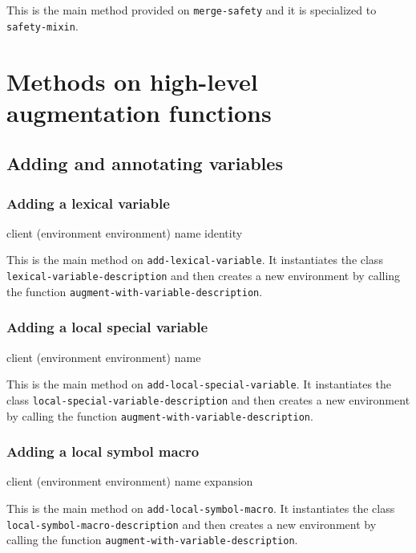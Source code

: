 This is the main method provided on \texttt{merge-safety} and it is
specialized to \texttt{safety-mixin}.

\section{Methods on high-level augmentation functions}

\subsection{Adding and annotating variables}

\subsubsection{Adding a lexical variable}


{\footnotesize
{}
{client
 (environment environment)
 name
 \optional identity}
}

This is the main method on \texttt{add-lexical-variable}.  It
instantiates the class \texttt{lexical-variable-description} and then
creates a new environment by calling the function
\texttt{augment-with-variable-description}.

\subsubsection{Adding a local special variable}

{\footnotesize
{}
{client
 (environment environment)
 name}
}

This is the main method on \texttt{add-local-special-variable}.  It
instantiates the class \texttt{local-special-variable-description} and then
creates a new environment by calling the function
\texttt{augment-with-variable-description}.

\subsubsection{Adding a local symbol macro}

{\footnotesize
{}
{client
 (environment environment)
 name
 expansion}
}

This is the main method on \texttt{add-local-symbol-macro}.  It
instantiates the class \texttt{local-symbol-macro-description} and then
creates a new environment by calling the function
\texttt{augment-with-variable-description}.

